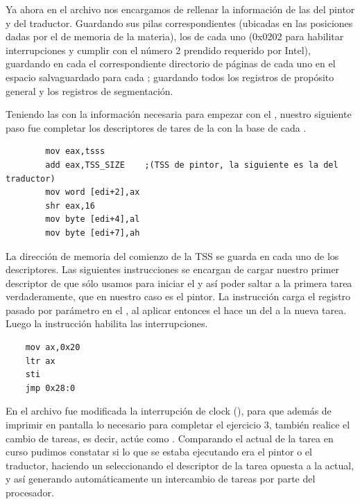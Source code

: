 	Ya ahora en el archivo  nos encargamos de rellenar la información de las  del pintor y del traductor. Guardando sus 
pilas correspondientes (ubicadas en las posiciones dadas por el  de memoria de la materia), los  de cada uno (0x0202 para 
habilitar interrupciones y cumplir con el  número 2 prendido requerido por Intel), guardando en cada  el correspondiente directorio 
de páginas de cada uno en el espacio salvaguardado para cada ; guardando todos los registros de propósito general y los registros de segmentación.

	Teniendo las  con la información necesaria para empezar con el , nuestro siguiente paso fue completar los 
descriptores de tares de la  con la base de cada .

\begin{verbatim}
		mov eax,tsss 
		add eax,TSS_SIZE	;(TSS de pintor, la siguiente es la del traductor) 
		mov word [edi+2],ax		
		shr eax,16 
		mov byte [edi+4],al 
		mov byte [edi+7],ah
\end{verbatim}

La dirección de memoria del comienzo de la TSS se guarda en cada uno de los descriptores. Las siguientes instrucciones se encargan de cargar nuestro 
primer descriptor de  que sólo usamos para iniciar el  y así poder saltar a la primera tarea verdaderamente, que en 
nuestro caso es el pintor. La instrucción  carga el registro pasado por parámetro en el , al aplicar entonces el 
 hace un  del  a la nueva tarea. Luego la instrucción  habilita las interrupciones. 

\begin{verbatim}	
	mov ax,0x20      	
	ltr ax 
	sti 
	jmp 0x28:0 
\end{verbatim}
	
En el archivo  fue modificada la interrupción de clock (), para que además de imprimir en pantalla lo necesario para completar 
el ejercicio 3, también realice el cambio de tareas, es decir, actúe como . Comparando el  actual de la tarea en curso pudimos 
constatar si lo que se estaba ejecutando era el pintor o el traductor, haciendo un  seleccionando el descriptor de la tarea opuesta a la 
actual, y así generando automáticamente un intercambio de tareas por parte del procesador.

